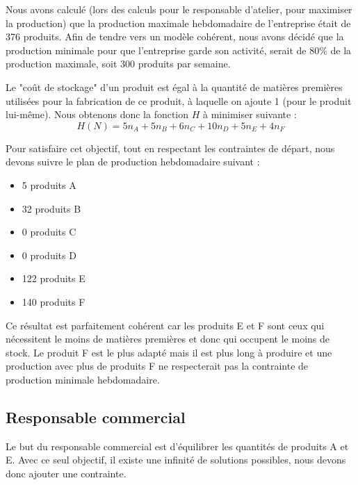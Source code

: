 \documentclass[a4paper,10pt]{article}
\begin{document}
Nous avons calculé (lors des calculs pour le responsable d'atelier, pour maximiser la production) que la production maximale hebdomadaire de l'entreprise était de 376 produits. Afin de tendre vers un modèle cohérent, nous avons décidé que la production minimale pour que l'entreprise garde son activité, serait de 80\% de la production maximale, soit 300 produits par semaine.\newline


Le "coût de stockage" d'un produit est égal à la quantité de matières premières utilisées pour la fabrication de ce produit, à laquelle on ajoute 1 (pour le produit lui-même). Nous obtenons donc la fonction $H$ à minimiser suivante :
$$ H(N)=  5n_A + 5n_B + 6n_C +10n_D + 5n_E + 4n_F $$

Pour satisfaire cet objectif, tout en respectant les contraintes de départ, nous devons suivre le plan de production hebdomadaire suivant :\newline
\begin{itemize}
\item[\textbullet] 5 produits A
\item[\textbullet] 32 produits B
\item[\textbullet] 0 produits C
\item[\textbullet] 0 produits D
\item[\textbullet] 122 produits E
\item[\textbullet] 140 produits F\newline
\end{itemize}

Ce résultat est parfaitement cohérent car les produits E et F sont ceux qui nécessitent le moins de matières premières et donc qui occupent le moins de stock. Le produit F est le plus adapté mais il est plus long à produire et une production avec plus de produits F ne respecterait pas la contrainte de production minimale hebdomadaire.


\subsection{Responsable commercial}

Le but du responsable commercial est d'équilibrer les quantités de produits A et E. Avec ce seul objectif, il existe une infinité de solutions possibles, nous devons donc ajouter une contrainte.
\end{document}
